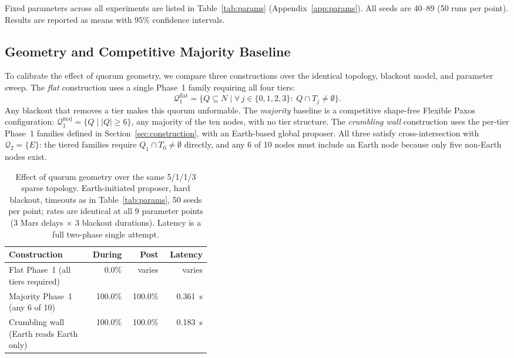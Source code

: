 \documentclass[letterpaper,twocolumn,10pt]{article}
\newcounter{prop}
\begin{document}
Fixed parameters across all experiments are listed in Table~\ref{tab:params} (Appendix~\ref{app:params}). All seeds are 40--89 (50 runs per point). Results are reported as means with 95\% confidence intervals.


\subsection{Geometry and Competitive Majority Baseline}

To calibrate the effect of quorum geometry, we compare three constructions over the identical topology, blackout model, and parameter sweep. The \emph{flat} construction uses a single Phase~1 family requiring all four tiers:
\[
\mathcal{Q}_1^{\text{flat}} = \bigl\{Q \subseteq N \;\big|\; \forall\, j \in \{0,1,2,3\}:\; Q \cap T_j \neq \emptyset\bigr\}.
\]
Any blackout that removes a tier makes this quorum unformable. The \emph{majority} baseline is a competitive shape-free Flexible Paxos configuration: $\mathcal{Q}_1^{\text{maj}} = \{Q \mid |Q| \ge 6\}$, any majority of the ten nodes, with no tier structure. The \emph{crumbling wall} construction uses the per-tier Phase~1 families defined in Section~\ref{sec:construction}, with an Earth-based global proposer. All three satisfy cross-intersection with $\mathcal{Q}_2 = \{E\}$: the tiered families require $Q_1 \cap T_0 \neq \emptyset$ directly, and any 6 of 10 nodes must include an Earth node because only five non-Earth nodes exist.

\begin{table}[t]
\centering
\small
\caption{Effect of quorum geometry over the same 5/1/1/3 sparse topology. Earth-initiated proposer, hard blackout, timeouts as in Table~\ref{tab:params}, 50 seeds per point; rates are identical at all 9 parameter points (3 Mars delays $\times$ 3 blackout durations). Latency is a full two-phase single attempt.}
\label{tab:flat-vs-wall}
\begin{tabular}{p{0.40\linewidth}rrr}
\toprule
Construction & During & Post & Latency \\
\midrule
Flat Phase~1 (all tiers required) & 0.0\% & varies & varies \\
Majority Phase~1 (any 6 of 10) & 100.0\% & 100.0\% & 0.361~s \\
Crumbling wall (Earth reads Earth only) & 100.0\% & 100.0\% & 0.183~s \\
\bottomrule
\end{tabular}
\end{table}
\end{document}
